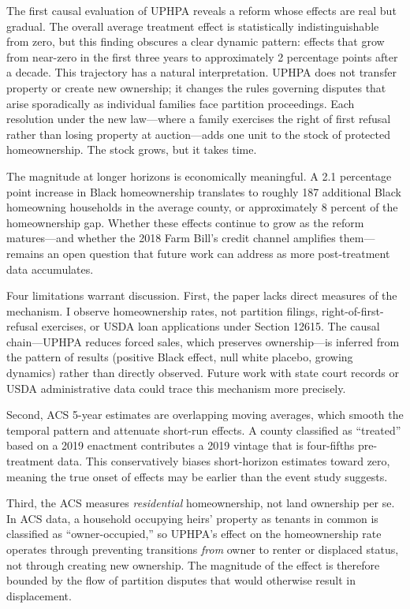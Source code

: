 \documentclass[12pt]{article}
\begin{document}
The first causal evaluation of UPHPA reveals a reform whose effects are real but gradual. The overall average treatment effect is statistically indistinguishable from zero, but this finding obscures a clear dynamic pattern: effects that grow from near-zero in the first three years to approximately 2 percentage points after a decade. This trajectory has a natural interpretation. UPHPA does not transfer property or create new ownership; it changes the rules governing disputes that arise sporadically as individual families face partition proceedings. Each resolution under the new law---where a family exercises the right of first refusal rather than losing property at auction---adds one unit to the stock of protected homeownership. The stock grows, but it takes time.

The magnitude at longer horizons is economically meaningful. A 2.1 percentage point increase in Black homeownership translates to roughly 187 additional Black homeowning households in the average county, or approximately 8 percent of the homeownership gap. Whether these effects continue to grow as the reform matures---and whether the 2018 Farm Bill's credit channel amplifies them---remains an open question that future work can address as more post-treatment data accumulates.

Four limitations warrant discussion. First, the paper lacks direct measures of the mechanism. I observe homeownership rates, not partition filings, right-of-first-refusal exercises, or USDA loan applications under Section 12615. The causal chain---UPHPA reduces forced sales, which preserves ownership---is inferred from the pattern of results (positive Black effect, null white placebo, growing dynamics) rather than directly observed. Future work with state court records or USDA administrative data could trace this mechanism more precisely.

Second, ACS 5-year estimates are overlapping moving averages, which smooth the temporal pattern and attenuate short-run effects. A county classified as ``treated'' based on a 2019 enactment contributes a 2019 vintage that is four-fifths pre-treatment data. This conservatively biases short-horizon estimates toward zero, meaning the true onset of effects may be earlier than the event study suggests.

Third, the ACS measures \textit{residential} homeownership, not land ownership per se. In ACS data, a household occupying heirs' property as tenants in common is classified as ``owner-occupied,'' so UPHPA's effect on the homeownership rate operates through preventing transitions \textit{from} owner to renter or displaced status, not through creating new ownership. The magnitude of the effect is therefore bounded by the flow of partition disputes that would otherwise result in displacement.
\end{document}
